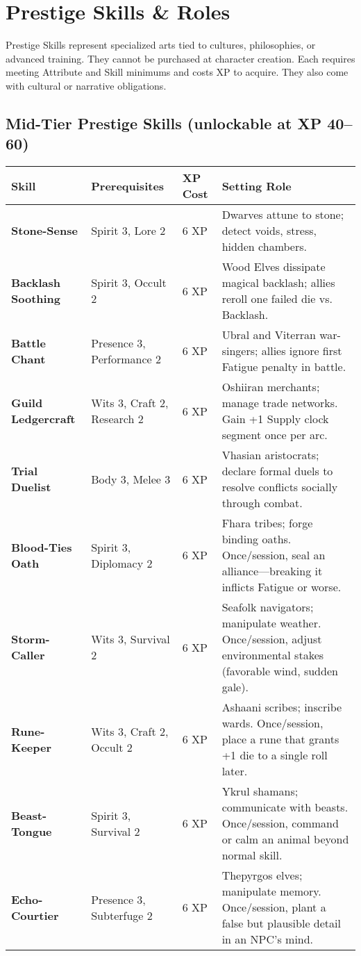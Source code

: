 \documentclass[12pt]{book}
\begin{document}
\section{Prestige Skills \& Roles}

Prestige Skills represent specialized arts tied to cultures, philosophies, or advanced training. 
They cannot be purchased at character creation. 
Each requires meeting Attribute and Skill minimums and costs XP to acquire. 
They also come with cultural or narrative obligations.

\subsection*{Mid-Tier Prestige Skills (unlockable at XP 40--60)}

\begin{tabular}{@{}llll@{}}
\toprule
\textbf{Skill} & \textbf{Prerequisites} & \textbf{XP Cost} & \textbf{Setting Role} \\
\midrule
\textbf{Stone-Sense} & Spirit 3, Lore 2 & 6 XP & Dwarves attune to stone; detect voids, stress, hidden chambers. \\
\textbf{Backlash Soothing} & Spirit 3, Occult 2 & 6 XP & Wood Elves dissipate magical backlash; allies reroll one failed die vs. Backlash. \\
\textbf{Battle Chant} & Presence 3, Performance 2 & 6 XP & Ubral and Viterran war-singers; allies ignore first Fatigue penalty in battle. \\
\textbf{Guild Ledgercraft} & Wits 3, Craft 2, Research 2 & 6 XP & Oshiiran merchants; manage trade networks. Gain +1 Supply clock segment once per arc. \\
\textbf{Trial Duelist} & Body 3, Melee 3 & 6 XP & Vhasian aristocrats; declare formal duels to resolve conflicts socially through combat. \\
\textbf{Blood-Ties Oath} & Spirit 3, Diplomacy 2 & 6 XP & Fhara tribes; forge binding oaths. Once/session, seal an alliance—breaking it inflicts Fatigue or worse. \\
\textbf{Storm-Caller} & Wits 3, Survival 2 & 6 XP & Seafolk navigators; manipulate weather. Once/session, adjust environmental stakes (favorable wind, sudden gale). \\
\textbf{Rune-Keeper} & Wits 3, Craft 2, Occult 2 & 6 XP & Ashaani scribes; inscribe wards. Once/session, place a rune that grants +1 die to a single roll later. \\
\textbf{Beast-Tongue} & Spirit 3, Survival 2 & 6 XP & Ykrul shamans; communicate with beasts. Once/session, command or calm an animal beyond normal skill. \\
\textbf{Echo-Courtier} & Presence 3, Subterfuge 2 & 6 XP & Thepyrgos elves; manipulate memory. Once/session, plant a false but plausible detail in an NPC’s mind. \\
\bottomrule
\end{tabular}
\end{document}
